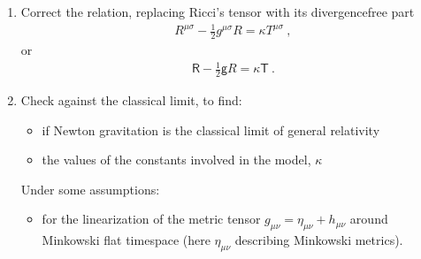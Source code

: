 \documentclass[letterpaper,10pt,english]{jupyterBook}
\begin{document}
\begin{enumerate}
\subsubsection*{Covariant derivative of the metric tensor}
\begin{equation*}
\begin{split}\begin{aligned}
  \nabla_{\nu} g_{\mu \eta}
  & = \partial_{\nu} g_{\mu \eta} - \Gamma_{\nu \mu}^{\sigma} g_{\sigma \eta} - \Gamma_{\nu \eta}^{\sigma} g_{\mu \sigma} = 0 \ ,
\end{aligned}\end{split}
\end{equation*}
\sphinxAtStartPar
as \(\partial_{\nu} g_{\mu \eta} = \Gamma_{\nu \mu}^{\sigma} g_{\sigma \eta} + \Gamma_{\nu \eta}^{\sigma} g_{\mu \sigma}\) (see the derivative of the components of the metric tensor in {\hyperref[\detokenize{ch/relativity-general/differential-geometry:relativity-general-notes-differential-geometry}]{}}.

\item {} 
\sphinxAtStartPar
Correct the relation, replacing Ricci’s tensor with its divergence\sphinxhyphen{}free part
\begin{equation}\label{equation:ch/relativity-general/einstein-equation:eq:einstein:equation}
\begin{split}R^{\mu \sigma} - \frac{1}{2} g^{\mu \sigma} R = \kappa T^{\mu \sigma} \ ,\end{split}
\end{equation}
\sphinxAtStartPar
or
\begin{equation*}
\begin{split}\mathsf{R} - \frac{1}{2} \mathsf{g} R = \kappa \mathsf{T} \ .\end{split}
\end{equation*}
\item {} 
\sphinxAtStartPar
Check against the classical limit, to find:
\begin{itemize}
\item {} 
\sphinxAtStartPar
if Newton gravitation is the classical limit of general relativity

\item {} 
\sphinxAtStartPar
the values of the constants involved in the model, \(\kappa\)

\end{itemize}

\sphinxAtStartPar
Under some assumptions:
\begin{itemize}
\item {} 
\sphinxAtStartPar
{} for the linearization of the metric tensor \(g_{\mu \nu} = \eta_{\mu \nu} + h_{\mu \nu}\) around Minkowski flat time\sphinxhyphen{}space (here \(\eta_{\mu \nu}\) describing Minkowski metrics).


\end{itemize}
\end{enumerate}
\end{document}
